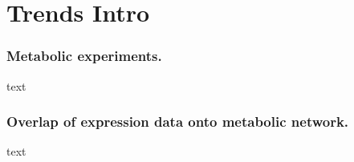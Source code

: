 \chapter{Trends Intro}

\subsection{Metabolic experiments.}
text

\subsection{Overlap of expression data onto metabolic network.}
text



